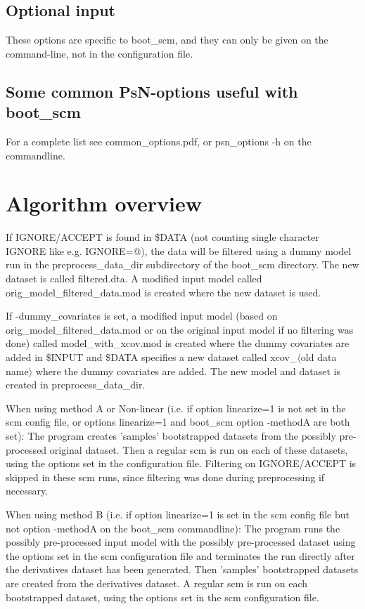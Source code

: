 \begin{optionlist}
\subsection{Optional input}
These options are specific to boot\_scm, and they can only be given on the command-line, not in the configuration file.
\end{optionlist}
\subsection{Some common PsN-options useful with boot\_scm}
For a complete list see common\_options.pdf, or psn\_options -h on the commandline.

\begin{optionlist}

\end{optionlist}

\section{Algorithm overview}

If IGNORE/ACCEPT is found in \$DATA (not counting single character IGNORE like e.g. IGNORE=@), 
the data will be filtered using a dummy model run in the preprocess\_data\_dir subdirectory of the boot\_scm directory. The new dataset is called
 filtered.dta. A modified input model called orig\_model\_filtered\_data.mod is created where the new dataset is used.

If -dummy\_covariates is set, a modified input model (based on orig\_model\_filtered\_data.mod or on the original input model if no filtering was done) 
called model\_with\_xcov.mod is created where the dummy covariates are added in \$INPUT and \$DATA specifies a new dataset called xcov\_$\langle$old 
data name$\rangle$ where the dummy covariates are added. The new model and dataset is created in preprocess\_data\_dir. 

When using method A or Non-linear (i.e. if option linearize=1 is not set in the scm config file, 
or options linearize=1 and boot\_scm option -methodA are both set): The program creates 'samples' bootstrapped datasets from the possibly pre-processed 
original dataset. Then a regular scm is run on each of these datasets, using the options set in the configuration file. Filtering on IGNORE/ACCEPT is skipped 
in these scm runs, since filtering was done during preprocessing if necessary. 

When using method B (i.e. if option linearize=1 is set in the scm config file but not option -methodA on the boot\_scm commandline): 
The program runs the possibly pre-processed input model with the possibly pre-processed dataset using the options set in the scm configuration 
file and terminates the run directly after the derivatives dataset has been generated. Then 'samples' bootstrapped datasets are created from the 
derivatives dataset. 
A regular scm is run on each bootstrapped dataset, using the options set in the scm configuration file. 

